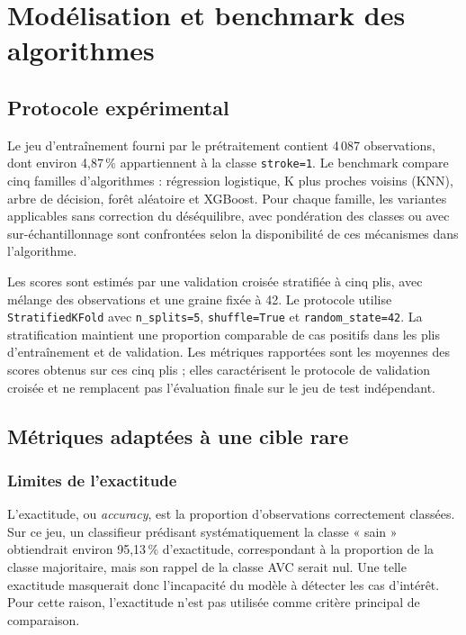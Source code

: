 \chapter{Modélisation et benchmark des algorithmes}
\label{chap:modelisation}
\thispagestyle{plain}

\section{Protocole expérimental}
Le jeu d'entraînement fourni par le prétraitement contient 4\,087 observations, dont environ 4,87\,\% appartiennent à la classe \texttt{stroke=1}. Le benchmark compare cinq familles d'algorithmes : régression logistique, K plus proches voisins (KNN), arbre de décision, forêt aléatoire et XGBoost. Pour chaque famille, les variantes applicables sans correction du déséquilibre, avec pondération des classes ou avec sur-échantillonnage sont confrontées selon la disponibilité de ces mécanismes dans l'algorithme.

Les scores sont estimés par une validation croisée stratifiée à cinq plis, avec mélange des observations et une graine fixée à 42. Le protocole utilise \texttt{StratifiedKFold} avec \texttt{n\_splits=5}, \texttt{shuffle=True} et \texttt{random\_state=42}. La stratification maintient une proportion comparable de cas positifs dans les plis d'entraînement et de validation. Les métriques rapportées sont les moyennes des scores obtenus sur ces cinq plis ; elles caractérisent le protocole de validation croisée et ne remplacent pas l'évaluation finale sur le jeu de test indépendant.

\section{Métriques adaptées à une cible rare}
\subsection{Limites de l'exactitude}
L'exactitude, ou \textit{accuracy}, est la proportion d'observations correctement classées. Sur ce jeu, un classifieur prédisant systématiquement la classe « sain » obtiendrait environ 95,13\,\% d'exactitude, correspondant à la proportion de la classe majoritaire, mais son rappel de la classe AVC serait nul. Une telle exactitude masquerait donc l'incapacité du modèle à détecter les cas d'intérêt. Pour cette raison, l'exactitude n'est pas utilisée comme critère principal de comparaison.

